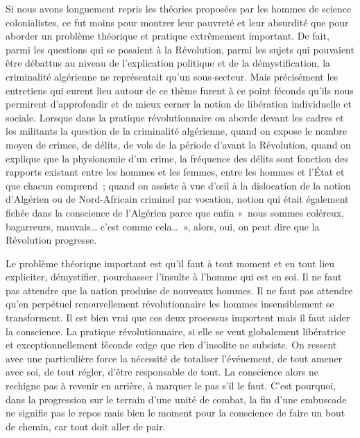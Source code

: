 \documentclass[french,twoside]{book} %
\begin{document}
\bigbreak
\noindent Si nous avons longuement repris les théories proposées par les hommes de science colonialistes, ce fut moins pour montrer leur pauvreté et leur absurdité que pour aborder un problème théorique et pratique extrêmement important. De fait, parmi les questions qui se posaient à la Révolution, parmi les sujets qui pouvaient être débattus au niveau de l’explication politique et de la démystification, la criminalité algérienne ne représentait qu’un sous-secteur. Mais précisément les entretiens qui eurent lieu autour de ce thème furent à ce point féconds qu’ils nous permirent d’approfondir et de mieux cerner la notion de libération individuelle et sociale. Lorsque dans la pratique révolutionnaire on aborde devant les cadres et les militants la question de la criminalité algérienne, quand on expose le nombre moyen de crimes, de délits, de vols de la période d’avant la Révolution, quand on explique que la physionomie d’un crime, la fréquence des délits sont fonction des rapports existant entre les hommes et les femmes, entre les hommes et l’État et que chacun   comprend ; quand on assiste à vue d’œil à la dislocation de la notion d’Algérien ou de Nord-Africain criminel par vocation, notion qui était également fichée dans la conscience de l’Algérien parce que enfin « nous sommes coléreux, bagarreurs, mauvais… c’est comme cela… », alors, oui, on peut dire que la Révolution progresse.\par
Le problème théorique important est qu’il faut à tout moment et en tout lieu expliciter, démystifier, pourchasser l’insulte à l’homme qui est en soi. Il ne faut pas attendre que la nation produise de nouveaux hommes. Il ne faut pas attendre qu’en perpétuel renouvellement révolutionnaire les hommes insensiblement se transforment. Il est bien vrai que ces deux processus importent mais il faut aider la conscience. La pratique révolutionnaire, si elle se veut globalement libératrice et exceptionnellement féconde exige que rien d’insolite ne subsiste. On ressent avec une particulière force la nécessité de totaliser l’événement, de tout amener avec soi, de tout régler, d’être responsable de tout. La conscience alors ne rechigne pas à revenir en arrière, à marquer le pas s’il le faut. C’est pourquoi, dans la progression sur le terrain d’une unité de combat, la fin d’une embuscade ne signifie pas le repos mais bien le moment pour la conscience de faire un bout de chemin, car tout doit aller de pair.\par
\end{document}

